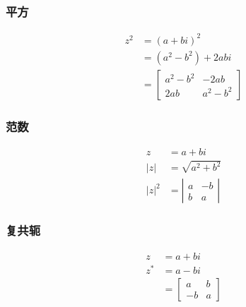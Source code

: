 \subsubsection*{平方}
$$
\begin{aligned}
z^{2} & =(a+b i)^{2} \\
& =\left(a^{2}-b^{2}\right)+2 a b i \\
& =\left[\begin{array}{cc}
a^{2}-b^{2} & -2 a b \\
2 a b & a^{2}-b^{2}
\end{array}\right]
\end{aligned}
$$

\subsubsection*{范数}
$$
\begin{aligned}
z & =a+b i \\
|z| & =\sqrt{a^{2}+b^{2}} \\
|z|^{2} & =\left|\begin{array}{cc}
a & -b \\
b & a
\end{array}\right|
\end{aligned}
$$

\subsubsection*{复共轭}
$$
\begin{aligned}
z & =a+b i \\
z^{*} & =a-b i \\
& =\left[\begin{array}{cc}
a & b \\
-b & a
\end{array}\right]
\end{aligned}
$$

